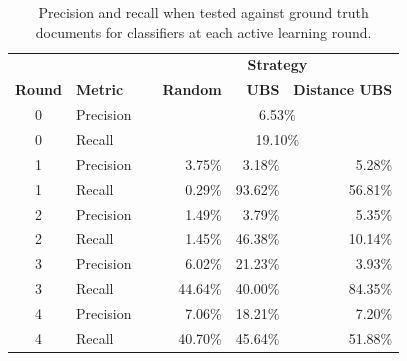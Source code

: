 \begin{table}[ht!]
\centering
\caption{Precision and recall when tested against ground truth documents for classifiers at each active learning round.\label{tab:pr_table}
}
\vspace{2ex}
\setlength\tabcolsep{6pt}
\begin{tabular}{|c| l | r | r | r |}
\hline
& & \multicolumn{3}{c|}{\textbf{Strategy}} \\
 \textbf{Round} & \textbf{Metric} & \textbf{Random} & \textbf{UBS}  & \textbf{Distance UBS}  \\
\hline
0 & Precision &        \multicolumn{3}{c|}{6.53\%} \\
0 & Recall\ \ \ \ \ &               \multicolumn{3}{c|}{19.10\%} \\
\hline
1 & Precision     & 3.75\%       &      3.18\%      &  5.28\% \\
1 & Recall\ \ \ \ \ & 0.29\%      &   93.62\%     &  56.81\% \\
\hline
2& Precision      & 1.49\%           &      3.79\%      &  5.35\% \\
2& Recall\ \ \ \ \ & 1.45\%           &    46.38\%      &  10.14\% \\
\hline
3 & Precision      & 6.02\%              &    21.23\%      &  3.93\% \\
3 & Recall\ \ \ \ \ & 44.64\%            &    40.00\%      &  84.35\%  \\
\hline
4& Precision     & 7.06\%          &    18.21\%      &  7.20\% \\
4& Recall\ \ \ \ \ & 40.70\%         &     45.64\%     &  51.88\% \\
\hline
\end{tabular}
\end{table}


